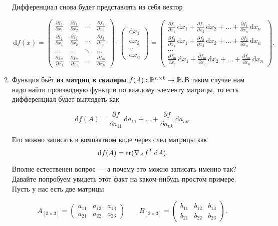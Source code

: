 \documentclass[12pt,fleqn]{article}
\newcommand{\dx}[1]{\,\mathrm{d}#1} %
\begin{document}
\begin{enumerate}
Дифференциал снова будет представлять из себя вектор

\[
\dx{f(x)} =  \begin{pmatrix} \frac{\partial f_1}{\partial x_1} & \frac{\partial f_1}{\partial x_2} & \ldots & \frac{\partial f_1}{\partial x_n} \\ \frac{\partial f_2}{\partial x_1}  & \frac{\partial f_2}{\partial x_2} & \ldots & \frac{\partial f_2}{\partial x_n}  \\ \ldots & \ldots & \ddots & \ldots  \\ \frac{\partial f_m}{\partial x_1}  & \frac{\partial f_m}{\partial x_2} & \ldots & \frac{\partial f_m}{\partial x_n} \end{pmatrix} \cdot  \begin{pmatrix} \dx{x_1} \\ \dx{x_2} \\ \ldots  \\ \dx{x_n} \end{pmatrix} =  \begin{pmatrix} \frac{\partial f_1}{\partial x_1} \dx{x_1} + \frac{\partial f_1}{\partial x_2} \dx{x_2} + \ldots + \frac{\partial f_1}{\partial x_n} \dx{x_n}  \\ \frac{\partial f_2}{\partial x_1} \dx{x_1} +  \frac{\partial f_2}{\partial x_2} \dx{x_2} + \ldots + \frac{\partial f_2}{\partial x_n} \dx{x_n}  \\ \ldots  \\ \frac{\partial f_m}{\partial x_1} \dx{x_1} + \frac{\partial f_m}{\partial x_2} \dx{x_2} + \ldots + \frac{\partial f_m}{\partial x_n} \dx{x_n} \end{pmatrix}.
\]

\item Функция бьёт \textbf{из матриц в скаляры} $f(A) : \RR^{n \times k} \to \RR.$В таком случае нам надо найти производную функции по каждому элементу матрицы, то есть дифференциал будет выглядеть как 

\[
\dx{f(A)} = \frac{\partial f}{\partial a_{11}} \dx{a_{11}} + \ldots + \frac{\partial f}{\partial a_{nk}} \dx{a_{nk}}.
\]

Его можно записать в компактном виде через след матрицы как 
\[
\dx{f(A)} = \Tr(\nabla_A f^T \dx{A}),
\] 

Вполне естественен вопрос --- а почему это можно записать именно так?  Давайте попробуем увидеть этот факт на каком-нибудь простом примере. Пусть у нас есть две матрицы 

\[
A_{[2 \times 3]} = \begin{pmatrix} a_{11} & a_{12} & a_{13} \\ a_{21} & a_{22} & a_{23} \end{pmatrix} \qquad B_{[2 \times 3]} = \begin{pmatrix} b_{11} & b_{12} & b_{13} \\ b_{21} & b_{22} & b_{23} \end{pmatrix}.
\]


\end{enumerate}
\end{document}
